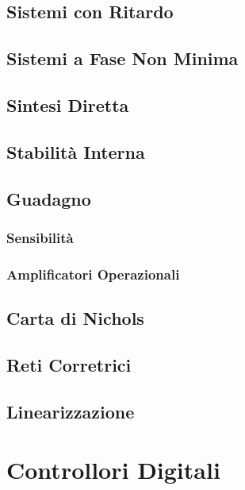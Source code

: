 \documentclass{article}
\numberwithin{equation}{subsection}
\begin{document}
\subsection{Sistemi con Ritardo}

\subsection{Sistemi a Fase Non Minima}

\subsection{Sintesi Diretta}

\subsection{Stabilità Interna}

\subsection{Guadagno}

\subsubsection{Sensibilità}

\subsubsection{Amplificatori Operazionali}

\subsection{Carta di Nichols}

\subsection{Reti Corretrici}

\subsection{Linearizzazione}

\clearpage

\section{Controllori Digitali}
\end{document}

